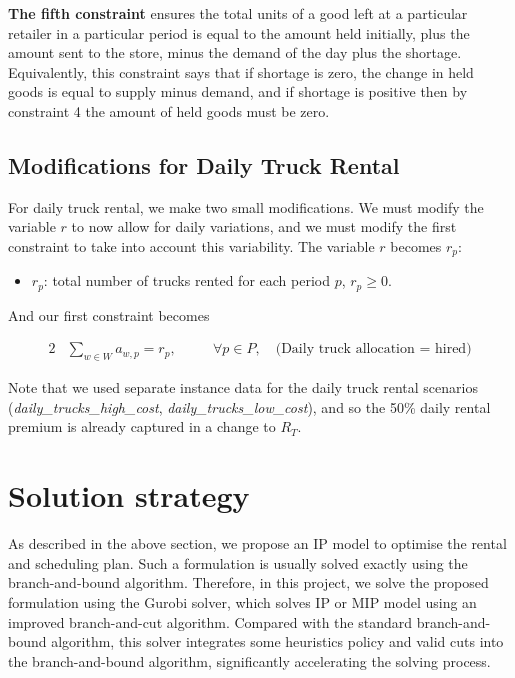 \documentclass[a4paper,12pt]{article}
\begin{document}
\textbf{The fifth constraint} ensures the total units of a good left at a particular retailer in a particular period is equal to the amount held initially, plus the amount sent to the store, minus the demand of the day plus the shortage.
Equivalently, this constraint says that if shortage is zero, the change in held goods is equal to supply minus demand, and if shortage is positive then by constraint 4 the amount of held goods must be zero.


\subsection{Modifications for Daily Truck Rental}\label{subsec:modifications-for-daily-truck-rental}
For daily truck rental, we make two small modifications.
We must modify the variable $r$ to now allow for daily variations, and we must modify the first constraint to take into account this variability.
The variable $r$ becomes $r_p$:

\begin{itemize}
    \item $r_p$: total number of trucks rented for each period $p$, $r_p \geq 0$.
\end{itemize}

And our first constraint becomes

\begin{alignat}{2}
     & \sum_{w\in W} a_{w,p} = r_p, & \quad & \forall p \in P, \quad \text{(Daily truck allocation = hired)}
\end{alignat}

Note that we used separate instance data for the daily truck rental scenarios (\textit{daily\_trucks\_high\_cost}, \textit{daily\_trucks\_low\_cost}), and so the 50\% daily rental premium is already captured in a change to $R_T$.


\section{Solution strategy}\label{sec:solution-strategy}

As described in the above section, we propose an IP model to optimise the rental and scheduling plan.
Such a formulation is usually solved exactly using the branch-and-bound algorithm.
Therefore, in this project, we solve the proposed formulation using the Gurobi solver, which solves IP or MIP model using an improved branch-and-cut algorithm.
Compared with the standard branch-and-bound algorithm, this solver integrates some heuristics policy and valid cuts into the branch-and-bound algorithm, significantly accelerating the solving process.
\end{document}
